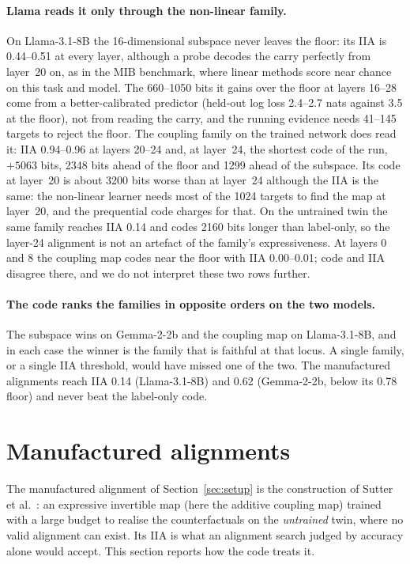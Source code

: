 \documentclass[11pt,a4paper]{article}
\begin{document}
\paragraph{Llama reads it only through the non-linear family.} On Llama-3.1-8B the 16-dimensional subspace never leaves the floor: its IIA is 0.44--0.51 at every layer, although a probe decodes the carry perfectly from layer~20 on, as in the MIB benchmark, where linear methods score near chance on this task and model. The 660--1050 bits it gains over the floor at layers 16--28 come from a better-calibrated predictor (held-out log loss 2.4--2.7 nats against 3.5 at the floor), not from reading the carry, and the running evidence needs 41--145 targets to reject the floor. The coupling family on the trained network does read it: IIA 0.94--0.96 at layers 20--24 and, at layer~24, the shortest code of the run, $+5063$ bits, 2348 bits ahead of the floor and 1299 ahead of the subspace. Its code at layer~20 is about 3200 bits worse than at layer~24 although the IIA is the same: the non-linear learner needs most of the 1024 targets to find the map at layer~20, and the prequential code charges for that. On the untrained twin the same family reaches IIA 0.14 and codes 2160 bits longer than label-only, so the layer-24 alignment is not an artefact of the family's expressiveness. At layers 0 and 8 the coupling map codes near the floor with IIA 0.00--0.01; code and IIA disagree there, and we do not interpret these two rows further.

\paragraph{The code ranks the families in opposite orders on the two models.} The subspace wins on Gemma-2-2b and the coupling map on Llama-3.1-8B, and in each case the winner is the family that is faithful at that locus. A single family, or a single IIA threshold, would have missed one of the two. The manufactured alignments reach IIA 0.14 (Llama-3.1-8B) and 0.62 (Gemma-2-2b, below its 0.78 floor) and never beat the label-only code.

\section{Manufactured alignments}
\label{sec:adversary}

The manufactured alignment of Section~\ref{sec:setup} is the construction of Sutter et al.~\cite{sutter2025}: an expressive invertible map (here the additive coupling map) trained with a large budget to realise the counterfactuals on the \emph{untrained} twin, where no valid alignment can exist. Its IIA is what an alignment search judged by accuracy alone would accept. This section reports how the code treats it.
\end{document}
